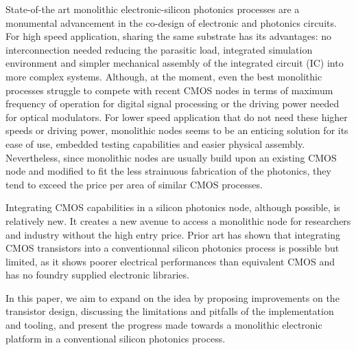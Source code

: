 State-of-the art monolithic electronic-silicon photonics processes are a monumental advancement in the co-design of electronic and photonics circuits.
For high speed application, sharing the same substrate has its advantages: no interconnection needed reducing the parasitic load, integrated simulation environment and simpler mechanical assembly of the integrated circuit (IC) into more complex systems.
Although, at the moment, even the best monolithic processes struggle to compete with recent CMOS nodes in terms of maximum frequency of operation for digital signal processing or the driving power needed for optical modulators. 
For lower speed application that do not need these higher speeds or driving power, monolithic nodes seems to be an enticing solution for its ease of use, embedded testing capabilities and easier physical assembly.
Nevertheless, since monolithic nodes are usually build upon an existing CMOS node and modified to fit the less strainuous fabrication of the photonics\CitationNeeded, they tend to exceed the price per area of similar CMOS processes\CitationNeeded. 

Integrating CMOS capabilities in a silicon photonics node, although possible, is relatively new. 
It creates a new avenue to access a monolithic node for researchers and industry without the high entry price.
Prior art has shown that integrating CMOS transistors into a conventionnal silicon photonics process is possible but limited\cite{zanetto_unconventional_2023,shekhar_roadmapping_2024}, as it shows poorer electrical performances than equivalent CMOS and has no foundry supplied electronic libraries.

In this paper, we aim to expand on the idea by proposing improvements on the transistor design, discussing the limitations and pitfalls of the implementation and tooling, and present the progress made towards a monolithic electronic platform in a conventional silicon photonics process.







